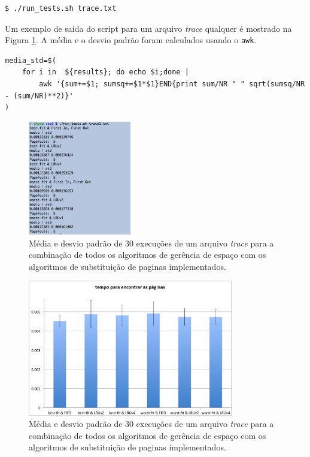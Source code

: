 \documentclass[12pt,a4paper]{article}
\begin{document}
\begin{lstlisting}
$ ./run_tests.sh trace.txt
\end{lstlisting}

Um exemplo de saída do script para um arquivo \textit{trace} qualquer é mostrado na Figura \ref{fig:run_tests}. A média e o desvio padrão foram calculados usando o \texttt{awk}.
\begin{lstlisting}
media_std=$(
    for i in  ${results}; do echo $i;done |
        awk '{sum+=$1; sumsq+=$1*$1}END{print sum/NR " " sqrt(sumsq/NR - (sum/NR)**2)}'
)
\end{lstlisting}
\begin{figure}[htpb]
\centering
\includegraphics[width=0.4\textwidth]{fig/run_tests.png}
\caption{Média e desvio padrão de 30 execuções de um arquivo \textit{trace} para a combinação de todos os algoritmos de gerência de espaço com os algoritmos de substituição de paginas implementados.}
\label{fig:run_tests}
\end{figure}

\begin{figure}[htpb]
\centering
\includegraphics[width=0.8\textwidth]{fig/resultados_ep3.png}
\caption{Média e desvio padrão de 30 execuções de um arquivo \textit{trace} para a combinação de todos os algoritmos de gerência de espaço com os algoritmos de substituição de paginas implementados.}
\label{fig:tempo}
\end{figure}
\end{document}
